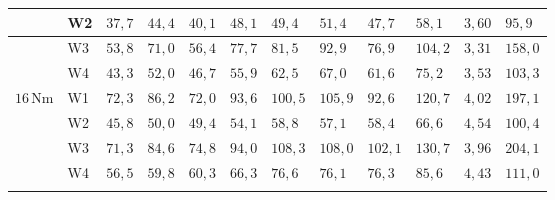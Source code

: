 \begin{table}[htbp]
\begin{tabular}{L{1.0cm}L{0.8cm}L{1.0cm}L{1.0cm}L{1.0cm}L{1.1cm}L{1.0cm}L{1.0cm}L{1.0cm}L{1.1cm}L{1.1cm}L{1.1cm}}
		\hline
		         & W2    & $37{,}7$                & $44{,}4$                & $40{,}1$                & $48{,}1$                  & $49{,}4$                  & $51{,}4$                  & $47{,}7$                  & $58{,}1$                    & $3{,}60$                 & $95{,}9$           \\
		\hline
		         & W3    & $53{,}8$                & $71{,}0$                & $56{,}4$                & $77{,}7$                  & $81{,}5$                  & $92{,}9$                  & $76{,}9$                  & $104{,}2$                   & $3{,}31$                 & $158{,}0$          \\
		\hline
		         & W4    & $43{,}3$                & $52{,}0$                & $46{,}7$                & $55{,}9$                  & $62{,}5$                  & $67{,}0$                  & $61{,}6$                  & $75{,}2$                    & $3{,}53$                 & $103{,}3$          \\
		\hline
		$16$\,Nm & W1    & $72{,}3$                & $86{,}2$                & $72{,}0$                & $93{,}6$                  & $100{,}5$                 & $105{,}9$                 & $92{,}6$                  & $120{,}7$                   & $4{,}02$                 & $197{,}1$          \\
		\hline
		         & W2    & $45{,}8$                & $50{,}0$                & $49{,}4$                & $54{,}1$                  & $58{,}8$                  & $57{,}1$                  & $58{,}4$                  & $66{,}6$                    & $4{,}54$                 & $100{,}4$          \\
		\hline
		         & W3    & $71{,}3$                & $84{,}6$                & $74{,}8$                & $94{,}0$                  & $108{,}3$                 & $108{,}0$                 & $102{,}1$                 & $130{,}7$                   & $3{,}96$                 & $204{,}1$          \\
		\hline
		         & W4    & $56{,}5$                & $59{,}8$                & $60{,}3$                & $66{,}3$                  & $76{,}6$                  & $76{,}1$                  & $76{,}3$                  & $85{,}6$                    & $4{,}43$                 & $111{,}0$          \\
		\hline
	\end{tabular}
\end{table}

